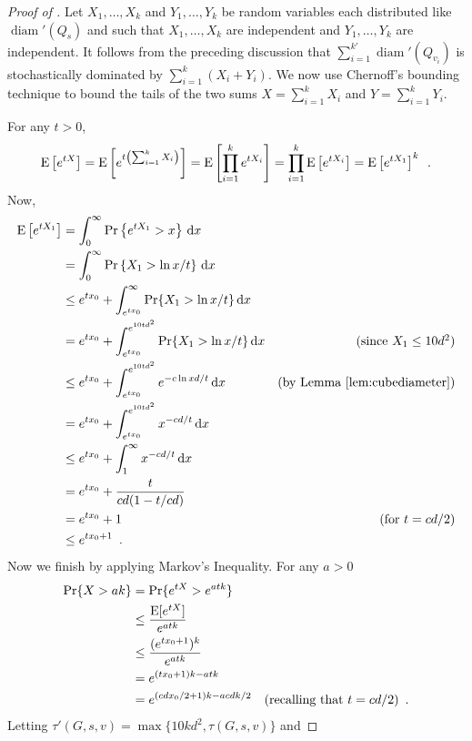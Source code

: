 \documentclass{patmorin}
\DeclareMathOperator{\diam}{diam}
\begin{document}
\begin{proof}[Proof of ]
Let $X_1,\ldots,X_k$ and $Y_1,\ldots,Y_k$ be random variables each
distributed like $\diam'(Q_s)$ and such that $X_1,\ldots,X_k$ are
independent and $Y_1,\ldots,Y_k$ are independent.  It follows from
the preceding discussion that $\sum_{i=1}^{k'}\diam'(Q_{v_i})$ is
stochastically dominated by $\sum_{i=1}^k (X_i+Y_i)$.  We now use
Chernoff's bounding technique to bound the tails of the two sums
$X=\sum_{i=1}^k X_i$ and $Y=\sum_{i=1}^k Y_i$.

For any $t>0$,
\[
    \mathrm{E}\left[e^{tX}\right] 
      = \mathrm{E}\left[e^{t\left(\sum_{i=1}^k X_i\right)}\right] 
      = \mathrm{E}\left[\prod_{i=1}^k e^{tX_i}\right]
      = \prod_{i=1}^k\mathrm{E}\left[e^{tX_i}\right]
      = \mathrm{E}\left[e^{tX_1}\right]^k \enspace .
\]
Now, 
\begin{align*}
   \E\left[e^{tX_1}\right]
     & = \int_0^\infty \Pr\left\{e^{tX_1} > x\right\}\,\mathrm{d}x \\
     & = \int_0^\infty \Pr\left\{X_1 > \ln x/t\right\}\,\mathrm{d}x \\
     & \le e^{tx_0} + \int_{e^{tx_0}}^\infty \Pr\{X_1 > \ln x/t\}\,\mathrm{d}x \\
     & = e^{tx_0} + \int_{e^{tx_0}}^{e^{10td^2}} \Pr\{X_1 > \ln x/t\}\,\mathrm{d}x 
       & \mbox{(since $X_1\le 10d^2$)} \\
     & \le e^{tx_0} + \int_{e^{tx_0}}^{e^{10td^2}} e^{-c\ln x d/t}\,\mathrm{d}x
     & \text{(by \lemref{cubediameter})} \\
     & =  e^{tx_0} + \int_{e^{tx_0}}^{e^{10td^2}} x^{-cd/t}\,\mathrm{d}x \\
     & \le  e^{tx_0} + \int_{1}^{\infty} x^{-cd/t}\,\mathrm{d}x \\
     & = e^{tx_0} + \frac{t}{cd(1-t/cd)} \\
     & = e^{tx_0} + 1 & \text{(for $t=cd/2$)} \\
     & \le e^{tx_0+1}  \enspace .
\end{align*}
Now we finish by applying Markov's Inequality.  For any $a>0$
\begin{align*}
   \Pr\{X > ak \} 
    &= \Pr\{ e^{tX} > e^{atk}\} \\
    &\le \frac{\mathrm{E}[e^{tX}]}{e^{atk}} \\
    &\le \frac{(e^{tx_0+1})^k}{e^{atk}} \\
    &= e^{(tx_0+1)k - atk} \\
    &= e^{(cdx_0/2+1)k - acdk/2} &\text{(recalling that $t=cd/2$)} \enspace .
\end{align*}
Letting $\tau'(G,s,v)=\max\{10kd^2, \tau(G,s,v)\}$
and 

\end{proof}
\end{document}
